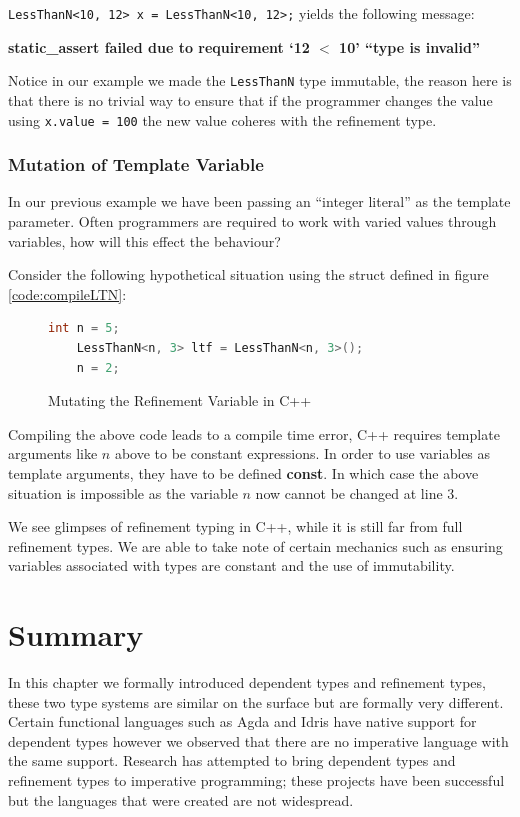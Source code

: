 \documentclass[a4paper,12pt]{report}
\begin{document}
\par
\verb|LessThanN<10, 12> x = LessThanN<10, 12>;| yields the following message: 
\par
\textbf{static\_assert failed due to requirement `12 $<$ 10' ``type is invalid''}

\par
Notice in our example we made the \verb|LessThanN| type immutable, the reason 
here is that there is no trivial way to ensure that if the programmer changes the 
value using \verb|x.value = 100| the new value coheres with the refinement 
type.

\subsubsection{Mutation of Template Variable}
In our previous example we have been passing an ``integer literal'' as the template 
parameter. Often programmers are required to 
work with varied values through variables, how will this effect the behaviour? 

\par
Consider the following hypothetical situation using the struct defined in 
figure \ref{code:compileLTN}: 

\begin{figure}[H]
  \begin{lstlisting}[language=c++]     
    int n = 5;
    LessThanN<n, 3> ltf = LessThanN<n, 3>();
    n = 2;
  \end{lstlisting}
  \caption{Mutating the Refinement Variable in C++}
\end{figure}

\par
Compiling the above code leads to a compile time error, C++ requires template 
arguments like $n$ above to be constant expressions. In order to use variables as template 
arguments, they have to be defined \textbf{const}. In which case the above 
situation is impossible as the variable $n$ now cannot be changed at line 3. 

\par
We see glimpses of refinement typing in C++, while it is still far from full 
refinement types. We are able to take note of certain mechanics such as ensuring 
variables associated with types are constant and the use of immutability. 

\section{Summary}
In this chapter we formally introduced dependent types and refinement types, 
these two type systems are similar on the surface but are formally very 
different. Certain functional languages such as Agda and Idris have native support for 
dependent types however we observed that there are no imperative language with 
the same support. Research has attempted to bring dependent types and refinement types 
to imperative programming; these projects have been successful but the languages 
that were created are not widespread. 
\end{document}
